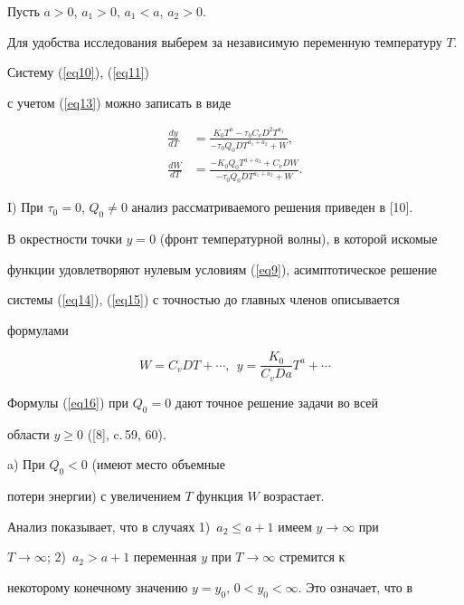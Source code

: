 Пусть $a>0$, $a_1>0$, $a_1<a$, $a_2>0$.


Для удобства исследования выберем за независимую переменную температуру $T$.


Систему (\ref{eq10}), (\ref{eq11}) 


с учетом (\ref{eq13}) можно записать в виде


\begin{align}


\label{eq14}


\frac{dy}{dT}&=\frac{K_0T^a-\tau_0C_vD^2T^{a_1}}


{-\tau_0Q_0DT^{a_1+a_2}+W},\\


\label{eq15}


\frac{dW}{dT}&=\frac{-K_0Q_0T^{a+a_2}+C_vDW}{-\tau_0Q_0DT^{a_1+a_2}+W}.


\end{align}





I) При $\tau_0=0$, $Q_0\ne0$ анализ рассматриваемого решения приведен в [10].


В окрестности точки $y=0$ (фронт температурной волны), в которой искомые


функции удовлетворяют нулевым условиям (\ref{eq9}), асимптотическое решение


системы (\ref{eq14}), (\ref{eq15}) с точностью до главных членов описывается


формулами


\begin{equation}\label{eq16}


W=C_vDT+\dotsb,\ \ y=\frac{K_0}{C_vDa}T^a+\dotsb


\end{equation}


Формулы (\ref{eq16}) при $Q_0=0$ дают точное решение задачи во всей


области $y\ge0$ ([8], c.\,59, 60).





a) При $Q_0<0$ (имеют место объемные 


потери энергии) с увеличением $T$ функция $W$ возрастает. 


Анализ показывает, что в случаях 1)~$a_2\le a+1$ имеем $y\to\infty$ при


$T\to\infty$; 2)~$a_2>a+1$ переменная $y$ при $T\to\infty$ стремится к


некоторому конечному значению $y=y_0$, $0<y_0<\infty$. Это означает, что в


